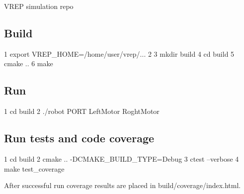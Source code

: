 V\+R\+EP simulation repo

\subsection*{Build}


\begin{DoxyCode}
1 export VREP\_HOME=/home/user/vrep/...
2 
3 mkdir build
4 cd build
5 cmake ..
6 make
\end{DoxyCode}


\subsection*{Run}


\begin{DoxyCode}
1 cd build
2 ./robot PORT LeftMotor RoghtMotor
\end{DoxyCode}


\subsection*{Run tests and code coverage}


\begin{DoxyCode}
1 cd build
2 cmake .. -DCMAKE\_BUILD\_TYPE=Debug
3 ctest --verbose
4 make test\_coverage
\end{DoxyCode}


After successful run coverage results are placed in {\ttfamily build/coverage/index.\+html}. 
